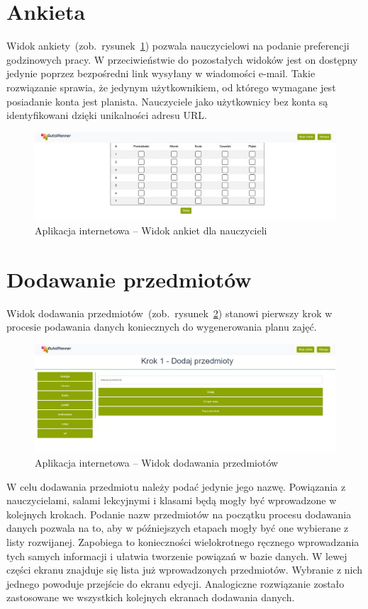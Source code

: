 \section{Ankieta}
Widok ankiety~(zob.~rysunek~\ref{rys:poll}) pozwala nauczycielowi na podanie preferencji godzinowych pracy. W przeciwieństwie do pozostałych widoków jest on dostępny jedynie poprzez bezpośredni link wysyłany w wiadomości e-mail. Takie rozwiązanie sprawia, że jedynym użytkownikiem, od którego wymagane jest posiadanie konta jest planista. Nauczyciele jako użytkownicy bez konta są identyfikowani dzięki unikalności adresu URL.
\begin{figure}[!ht]
\centering\includegraphics[width=\textwidth]{figures/poll}
\caption{Aplikacja internetowa -- Widok ankiet dla nauczycieli}\label{rys:poll}
\end{figure}
\section{Dodawanie przedmiotów}
Widok dodawania przedmiotów~(zob.~rysunek~\ref{rys:subject}) stanowi pierwszy krok w procesie podawania danych koniecznych do wygenerowania planu zajęć. 
 
\begin{figure}[h]
\centering\includegraphics[width=\textwidth]{figures/subject}
\caption{Aplikacja internetowa -- Widok dodawania przedmiotów}\label{rys:subject}
\end{figure}
W celu dodawania przedmiotu należy podać jedynie jego nazwę. Powiązania z nauczycielami, salami lekcyjnymi i klasami będą mogły być wprowadzone w kolejnych krokach. Podanie nazw przedmiotów na początku procesu dodawania danych pozwala na to, aby w późniejszych etapach mogły być one wybierane z listy rozwijanej. Zapobiega to konieczności wielokrotnego ręcznego wprowadzania tych samych informacji i ułatwia tworzenie powiązań w bazie danych. W lewej części ekranu znajduje się lista już wprowadzonych przedmiotów. Wybranie z nich jednego powoduje przejście do ekranu edycji. Analogiczne rozwiązanie zostało zastosowane we wszystkich kolejnych ekranach dodawania danych.
